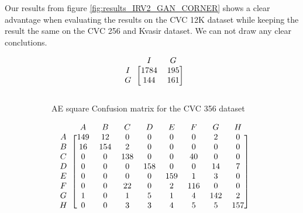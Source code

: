 Our results from figure \ref{fig:results_IRV2_GAN_CORNER} shows a clear advantage when evaluating the results on the CVC 12K dataset while keeping the result the same on the CVC 256 and Kvasir dataset. 
We can not draw any clear conclutions.



\begin{figure}[h]
\myfontsize
\caption*{\footnotesize \textmd{ \textbf{A}:{dyed-lifted-polyps} , \textbf{B}:{dyed-resection-margins} , \textbf{C}:{esophagitis} , \textbf{D}:{normal-cecum} , \textbf{E}:{normal-pylorus} , \textbf{F}:{normal-z-line} , \textbf{G}:{polyps} , \textbf{H}:{ulcerative-colitis} , \textbf{I}:{non-polyp}}}

\begin{subfigure}[b]{0.25\textwidth}
     
\[
\begin{blockarray}{ccc}
& I & G  \\
\begin{block}{c[cc]}
        I&1784  &  195\\
        G& 144 &  161\\
\end{block}
\end{blockarray}
 \]         

\caption{AE square Confusion matrix for the CVC 356 dataset}
\label{mat:cvc356_CM_IRV2_AE_SQUARE}
\end{subfigure}
\begin{subfigure}[b]{0.49\textwidth}  
\scriptsize     
\[
\begin{blockarray}{ccccccccc}
& A & B & C & D & E & F & G & H \\
\begin{block}{c[cccccccc]}
A&149 & 12 & 0 & 0 & 0 & 0 & 2 & 0\\
B& 16 & 154 & 2 & 0 & 0 & 0 & 0 & 0\\
C&  0 & 0 & 138 & 0 & 0 & 40 & 0 & 0\\
D&  0 & 0 & 0 & 158 & 0 & 0 & 14 & 7\\
E&  0 & 0 & 0 & 0 & 159 & 1 & 3 & 0\\
F&  0 & 0 & 22 & 0 & 2 & 116 & 0 & 0\\
G&  1 & 0 & 1 & 5 & 1 & 4 & 142 & 2\\
H&  0 & 0 & 3 & 3 & 4 & 5 & 5 & 157\\
\end{block}
\end{blockarray}
 \]        
        

\end{subfigure}
\end{figure}
